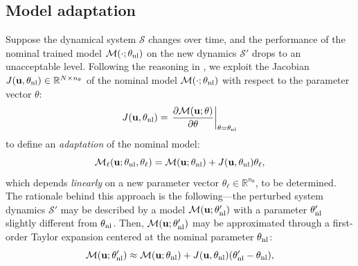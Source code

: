 \documentclass{article}
\newcommand{\nsamp}{{N}}
\newcommand{\npar}{{n_\theta}}
\newcommand{\M}{\mathcal{M}}
\newcommand{\R}{{\mathbb{R}}}
\newcommand{\sys}{{\mathcal{S}}}
\newcommand{\lin}{{\ell}}
\newcommand{\nominal}{{\rm{nl}}}
\newcommand{\tvec}[1]{{\mathbf{#1}}}
\begin{document}
\subsection{Model adaptation}
\label{subsec:BLR}
Suppose the dynamical system $\sys$ changes over time, and the performance of 
the nominal trained model $\M(\cdot; \theta_\nominal)$ on the new dynamics $\sys'$ drops to an unacceptable level.
Following the reasoning in \cite{maddox2021fast}, we exploit
the Jacobian $J(\tvec{u}, \theta_\nominal) \in \R^{\nsamp \times \npar}$ of the nominal model $\M(\cdot; \theta_\nominal)$ with respect to 
the parameter vector $\theta$:
\begin{equation}
    J(\tvec{u}, \theta_\nominal) = \left . \frac{\partial \M(\tvec{u}; \theta)}{\partial \theta} \right |_{\theta = \theta_\nominal}
\end{equation}
to define an \emph{adaptation} of the nominal model:
\begin{equation}
\label{eq:model_adaptation}
\M_\lin(\tvec{u}; \theta_{\nominal}, \theta_\lin) = \M({\tvec{u}}; \theta_\nominal) + J(\tvec{u}, \theta_\nominal) \theta_\lin,
\end{equation}
which depends \emph{linearly} on a new parameter vector $\theta_\lin \in \R^{n_{\theta}}$, to be determined. 
The rationale behind this approach is the following---the perturbed system dynamics $\sys'$ may be described 
by a model $\M({\tvec{u}}; \theta_\nominal')$ with a parameter $\theta_\nominal'$ slightly different from $\theta_\nominal$.
Then, $\M({\tvec{u}}; \theta_\nominal')$ may be approximated through a first-order Taylor expansion centered at  
the nominal parameter $\theta_\nominal$: 
\begin{equation*}
\M({\tvec{u}}; \theta_\nominal') \approx \M({\tvec{u}}; \theta_\nominal) + J(\tvec{u}, \theta_\nominal) 
(\theta_\nominal' - \theta_\nominal)
,
\end{equation*}
\end{document}
